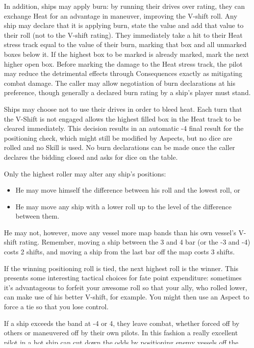 In addition, ships may apply burn: by running their drives over rating, they can exchange Heat for an advantage in maneuver, improving the V-shift roll. Any ship may declare that it is applying burn, state the value and add that value to their roll (not to the V-shift rating). They immediately take a hit to their Heat stress track equal to the value of their burn, marking that box and all unmarked boxes below it. If the highest box to be marked is already marked, mark the next higher open box. Before marking the damage to the Heat stress track, the pilot may reduce the detrimental effects through Consequences exactly as mitigating combat damage. The caller may allow negotiation of burn declarations at his preference, though generally a declared burn rating by a ship's player must stand.

Ships may choose not to use their drives in order to bleed heat. Each turn that the V-Shift is not engaged allows the highest filled box in the Heat track to be cleared immediately. This decision results in an automatic -4 final result for the positioning check, which might still be modified by Aspects, but no dice are rolled and no Skill is used. No burn declarations can be made once the caller declares the bidding closed and asks for dice on the table.

Only the highest roller may alter any ship's positions:
\begin{itemize}
\item He may move himself the difference between his roll and the lowest roll, or
\item He may move any ship with a lower roll up to the level of the
difference between them.
\end{itemize}

He may not, however, move any vessel more map bands than his own vessel's V-shift rating. Remember, moving a ship between the 3 and 4 bar (or the -3 and -4) costs 2 shifts, and moving a ship from the last bar off the map costs 3 shifts.

If the winning positioning roll is tied, the next highest roll is the winner. This presents some interesting tactical choices for fate point expenditure: sometimes it's advantageous to forfeit your awesome roll so that your ally, who rolled lower, can make use of his better V-shift, for example. You might then use an Aspect to force a tie so that you lose control.

If a ship exceeds the band at -4 or 4, they leave combat, whether forced off by others or maneuvered off by their own pilots. In this fashion a really excellent pilot in a hot ship can cut down the odds by positioning enemy vessels off the map until he faces only one opponent. Similarly, more than two ships chasing a single ship can usually keep the lone opponent on the map through positioning.

